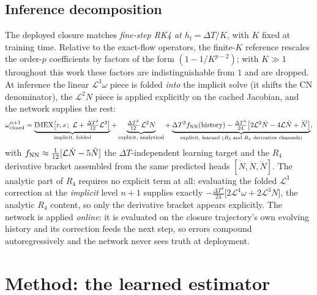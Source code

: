 \documentclass[11pt]{article}
\theoremstyle{plain}
\theoremstyle{definition}
\newcommand{\Lop}{\mathcal{L}}
\newcommand{\Ndot}{\dot{N}}
\newcommand{\Nddot}{\ddot{N}}
\newcommand{\Ndddot}{\dddot{N}}
\newcommand{\DT}{\Delta T}
\newcommand{\hf}{h_{\mathrm{f}}}
\begin{document}
\subsection{Inference decomposition}
The deployed closure matches \emph{fine-step RK4 at $\hf=\DT/K$}, with $K$
fixed at training time. Relative to the exact-flow operators, the finite-$K$
reference rescales the order-$p$ coefficients by factors of the form
$(1-1/K^{p-2})$; with $K\gg1$ throughout this work these factors are
indistinguishable from $1$ and are dropped. At inference the linear
$\Lop^3\omega$ piece is folded \emph{into} the implicit solve (it shifts the
CN denominator), the $\Lop^2N$ piece is applied explicitly on the cached
Jacobian, and the network supplies the rest:
\begin{equation}
\omega^{n+1}_{\rm closed}
=\underbrace{\text{IMEX}\big[r,s\,;\ \Lop+\tfrac{\DT^2}{12}\Lop^3\big]}
 _{\text{implicit, folded}}
+\underbrace{\tfrac{\DT^3}{12}\,\Lop^2N}
 _{\text{explicit, analytical}}
+\underbrace{\DT^3 f_{\rm NN}(\text{history})
 -\tfrac{\DT^4}{24}\big[2\Lop^2\Ndot-4\Lop\Nddot+\Ndddot\big]}
 _{\text{explicit, learned ($R_3$ and $R_4$ derivative channels)}},
\label{eq:inference}
\end{equation}
with $f_{\rm NN}\approx\tfrac1{12}[\Lop\Ndot-5\Nddot]$ the $\DT$-independent
learning target and the $R_4$ derivative bracket assembled from the same
predicted heads $[\Ndot,\Nddot,\Ndddot]$. The analytic part of $R_4$
requires no explicit term at all: evaluating the folded $\Lop^3$
correction at the \emph{implicit} level $n{+}1$ supplies exactly
$-\tfrac{\DT^4}{24}\big[2\Lop^4\omega+2\Lop^3N\big]$, the analytic $R_4$
content, so only the derivative bracket appears explicitly. The network is
applied \emph{online}: it is evaluated on the closure trajectory's own
evolving history and its correction feeds the next step, so errors compound
autoregressively and the network never sees truth at deployment.

\section{Method: the learned estimator}
\label{sec:method}
\end{document}
